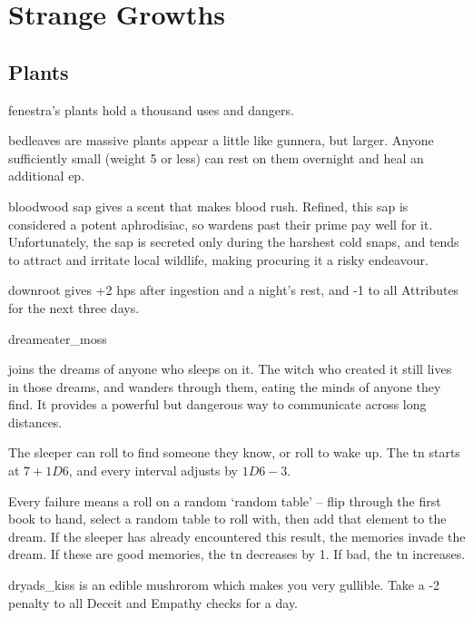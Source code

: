 \chapter{Strange Growths}
\label{growths}

\section{Plants}
\label{plants}

\begin{multicols}{2}
\renewcommand\npcsymbol{\glsentrytext{plant}}

\noindent
\Gls{fenestra}'s plants hold a thousand uses and dangers.

%
  {bedleaves}%
  {are massive plants appear a little like gunnera, but larger.
  Anyone sufficiently small (\gls{weight} 5 or less) can rest on them overnight and heal an additional \gls{ep}.}%

%
  {bloodwood}%
  {sap gives a scent that makes blood rush.
  Refined, this sap is considered a potent aphrodisiac, so \glspl{warden} past their prime pay well for it.
  Unfortunately, the sap is secreted only during the harshest cold snaps, 
  and tends to attract and irritate local wildlife, making procuring it a risky endeavour.
  }

%
  {downroot}%
  {gives +2 \glspl{hp} after ingestion and a night's rest, and -1 to all Attributes for the next three days.
  }

%
  {dreameater_moss}%
  {joins the dreams of anyone who sleeps on it.
    The witch who created it still lives in those dreams, and wanders through them, eating the minds of anyone they find.
    It provides a powerful but dangerous way to communicate across long distances.

    The sleeper can roll  to find someone they know, or roll  to wake up.
    The \gls{tn} starts at $7 + 1D6$, and every \gls{interval} adjusts by $1D6 - 3$.

    Every failure means a roll on a random `random table' -- flip through the first book to hand, select a random table to roll with, then add that element to the dream.
    If the sleeper has already encountered this result, the memories invade the dream.
    If these are good memories, the \gls{tn} decreases by 1.
    If bad, the \gls{tn} increases.
  }

%
  {dryads_kiss}%
  {is an edible mushrorom which makes you very gullible.
  Take a -2 penalty to all Deceit and Empathy checks for a day.}%


\end{multicols}
